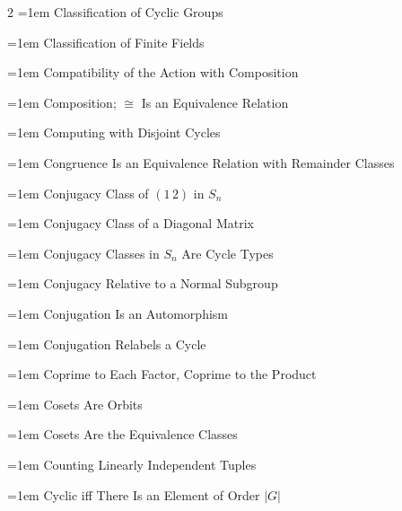 \documentclass[11pt]{report}
\begin{document}
\begin{multicols}{2}
\noindent\hangindent=1em Classification of Cyclic Groups\dotfill \pageref{thm:classification-cyclic-groups}\par
\noindent\hangindent=1em Classification of Finite Fields\dotfill \pageref{thm:classification-finite-fields}\par
\noindent\hangindent=1em Compatibility of the Action with Composition\dotfill \pageref{prop:compatibility-action-composition}\par
\noindent\hangindent=1em Composition; $\cong$ Is an Equivalence Relation\dotfill \pageref{prop:composition-iso-equivalence-relation}\par
\noindent\hangindent=1em Computing with Disjoint Cycles\dotfill \pageref{prop:computing-disjoint-cycles}\par
\noindent\hangindent=1em Congruence Is an Equivalence Relation with Remainder Classes\dotfill \pageref{prop:congruence-equivalence-relation-remainder}\par
\noindent\hangindent=1em Conjugacy Class of $(1\,2)$ in $S_n$\dotfill \pageref{prop:conjugacy-class-1-2-sn}\par
\noindent\hangindent=1em Conjugacy Class of a Diagonal Matrix\dotfill \pageref{prop:conjugacy-class-diagonal-matrix}\par
\noindent\hangindent=1em Conjugacy Classes in $S_n$ Are Cycle Types\dotfill \pageref{thm:conjugacy-classes-sn-cycle-types}\par
\noindent\hangindent=1em Conjugacy Relative to a Normal Subgroup\dotfill \pageref{prop:conjugacy-normal-subgroup}\par
\noindent\hangindent=1em Conjugation Is an Automorphism\dotfill \pageref{prop:conjugation-automorphism}\par
\noindent\hangindent=1em Conjugation Relabels a Cycle\dotfill \pageref{prop:conjugation-relabels-cycle}\par
\noindent\hangindent=1em Coprime to Each Factor, Coprime to the Product\dotfill \pageref{lem:coprime-each-factor-coprime-product}\par
\noindent\hangindent=1em Cosets Are Orbits\dotfill \pageref{prop:cosets-orbits}\par
\noindent\hangindent=1em Cosets Are the Equivalence Classes\dotfill \pageref{prop:cosets-equivalence-classes}\par
\noindent\hangindent=1em Counting Linearly Independent Tuples\dotfill \pageref{lem:count-independent-tuples}\par
\noindent\hangindent=1em Cyclic iff There Is an Element of Order $|G|$\dotfill \pageref{cor:cyclic-iff-element-order-g}\par

\end{multicols}
\end{document}
